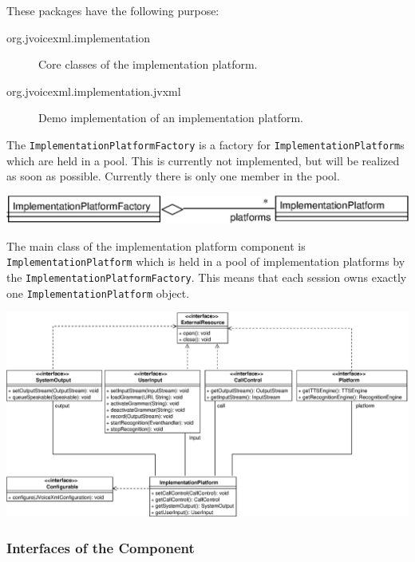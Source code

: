 \documentclass[11pt,a4paper]{article}
\begin{document}
These packages have the following purpose:

\begin{description}
\item[org.jvoicexml.implementation] Core classes of the implementation
platform.
\item[org.jvoicexml.implementation.jvxml] Demo implementation of
an implementation platform.
\end{description}

The \texttt{ImplementationPlatformFactory} is a factory for
\texttt{Implementation\-Platform}s which are held in a pool.
This is currently not implemented, but will be realized as soon as possible.
Currently there is only one member in the pool.

\begin{center}
\includegraphics[scale=0.8]{class-implementationplatformfactory.eps}
\end{center}

The main class of the implementation platform component is 
\texttt{Implemen\-tat\-ion\-Plat\-form} which is held in a pool of 
implementation
platforms by the \texttt{Implementat\-ionPlat\-form\-Factory}. This means
that each session owns exactly one \texttt{Implemen\-tat\-ionPlat\-form}
object.

\begin{center}
\includegraphics[scale=0.4]{class-implementation-implementationplatform.eps}
\end{center}

\subsubsection{Interfaces of the Component}
\end{document}
